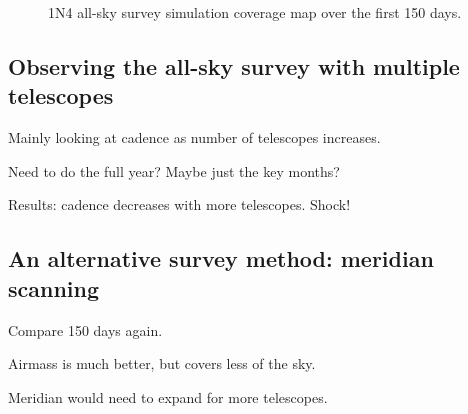 \begin{colsection}
\begin{colsection}
\begin{figure}[p]
    \caption[1N4 all-sky survey simulation coverage map of observations over the first 150 days]{
        1N4 all-sky survey simulation coverage map over the first 150 days.
    }\label{fig:allsky_coverage_1n4}
\end{figure}

\clearpage

\end{colsection}


\subsection{Observing the all-sky survey with multiple telescopes}
\label{sec:allsky_sim_multiscope}
\begin{colsection}

Mainly looking at cadence as number of telescopes increases.

Need to do the full year? Maybe just the key months?

Results: cadence decreases with more telescopes. Shock!

\end{colsection}


\subsection{An alternative survey method: meridian scanning}
\label{sec:allsky_sim_meridian}
\begin{colsection}

Compare 150 days again.

Airmass is much better, but covers less of the sky.

Meridian would need to expand for more telescopes.

\end{colsection}


\end{colsection}


